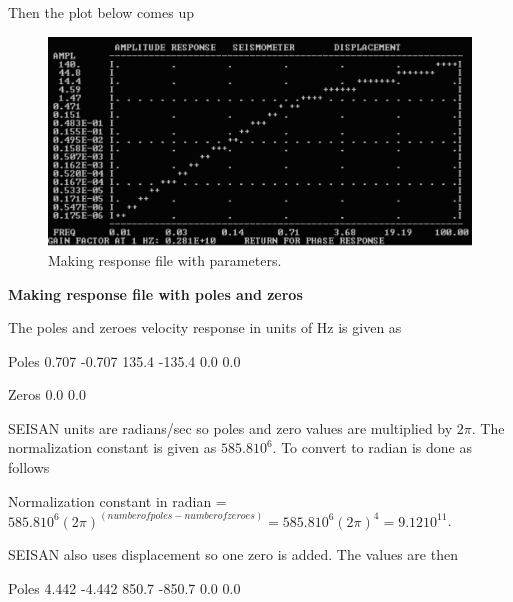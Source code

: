 Then the plot below comes up 

\begin{figure}
\centerline{\includegraphics[width=0.9\linewidth]{fig/fig49}}
\caption{Making response file with parameters.}
\end{figure}

\textbf{Making response file with poles and zeros}

The poles and zeroes velocity response in units of Hz is given as 

Poles  0.707  -0.707  135.4  -135.4  0.0  0.0 

Zeros  0.0  0.0 

SEISAN units are radians/sec so poles and zero values  are multiplied by $2\pi$. \newline
The normalization constant is given as $585.8 10^{6}$. To convert to radian is done as follows 

Normalization constant in radian = $585.8 10^{6} (2\pi)^{(number of poles-number of zeroes)} 
= 585.8 10^{6} (2\pi)^{4} = 9.12 10^{11}$. 

SEISAN also uses displacement so one zero is added. The values are then 

Poles 4.442  -4.442  850.7  -850.7  0.0  0.0 


